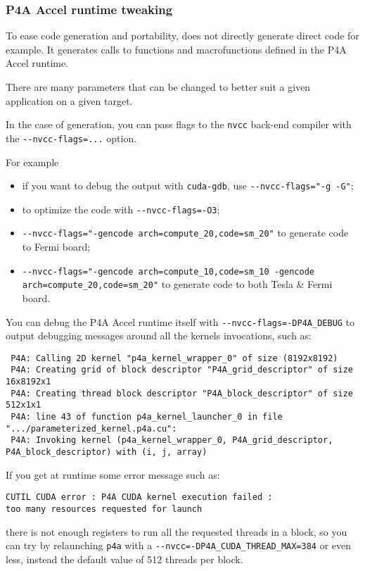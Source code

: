 \documentclass[a4paper]{article}
\begin{document}
\subsubsection{P4A Accel runtime tweaking}
\label{sec:p4a-accel-runtime}

To ease code generation and portability, \Apfa does not directly generate
direct \Acuda code for example. It generates calls to functions and
macrofunctions defined in the P4A Accel runtime.

There are many parameters that can be changed to better suit a given
application on a given target.

In the case of \Acuda generation, you can pass flags to the \texttt{nvcc}
back-end compiler with the \verb|--nvcc-flags=...| option.

For example
\begin{itemize}
\item if you want to debug the output with \texttt{cuda-gdb}, use
  \verb|--nvcc-flags="-g -G"|;
\item to optimize the \Acuda code with \verb|--nvcc-flags=-O3|;
\item \verb|--nvcc-flags="-gencode arch=compute_20,code=sm_20"| to
  generate code to Fermi board;
\item
  \verb|--nvcc-flags="-gencode arch=compute_10,code=sm_10 -gencode arch=compute_20,code=sm_20"|
  to generate code to both Tesla \& Fermi board.
\end{itemize}

You can debug the P4A Accel runtime itself with
\verb|--nvcc-flags=-DP4A_DEBUG| to output debugging messages around all
the \Acuda kernels invocations, such as: {\scriptsize
\begin{verbatim}
 P4A: Calling 2D kernel "p4a_kernel_wrapper_0" of size (8192x8192)
 P4A: Creating grid of block descriptor "P4A_grid_descriptor" of size 16x8192x1
 P4A: Creating thread block descriptor "P4A_block_descriptor" of size 512x1x1
 P4A: line 43 of function p4a_kernel_launcher_0 in file ".../parameterized_kernel.p4a.cu":
 P4A: Invoking kernel (p4a_kernel_wrapper_0, P4A_grid_descriptor, P4A_block_descriptor) with (i, j, array)
\end{verbatim}
}

If you get at runtime some error message such as:
\begin{verbatim}
CUTIL CUDA error : P4A CUDA kernel execution failed :
too many resources requested for launch
\end{verbatim}
there is not enough registers to run all the requested threads in a block,
so you can try by relaunching \texttt{p4a} with a
\verb|--nvcc=-DP4A_CUDA_THREAD_MAX=384| or even less, instead the default
value of 512 threads per block.
\end{document}
